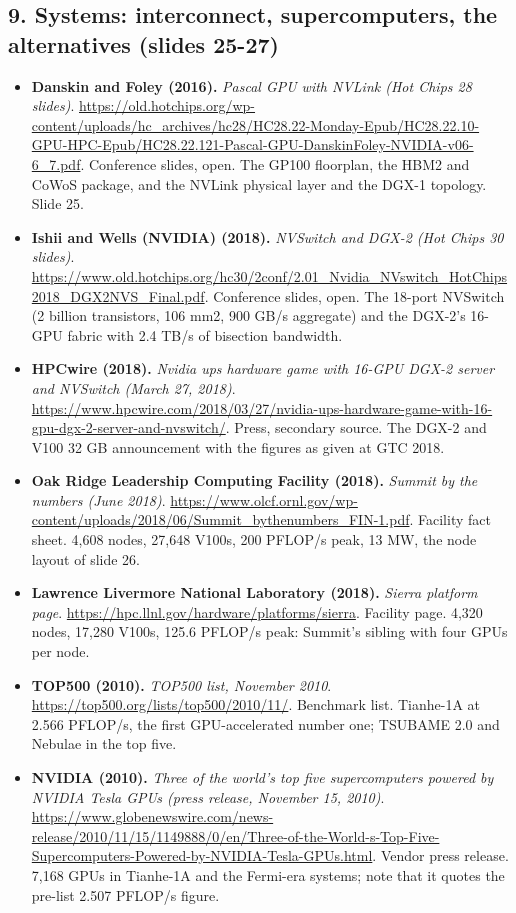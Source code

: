 \subsection*{9. Systems: interconnect, supercomputers, the alternatives (slides 25-27)}
\begin{itemize}[leftmargin=1.2em,itemsep=3pt]\sloppy
\item \textbf{Danskin and Foley (2016).} \textit{Pascal GPU with NVLink (Hot Chips 28 slides)}. \url{https://old.hotchips.org/wp-content/uploads/hc_archives/hc28/HC28.22-Monday-Epub/HC28.22.10-GPU-HPC-Epub/HC28.22.121-Pascal-GPU-DanskinFoley-NVIDIA-v06-6_7.pdf}. Conference slides, open. The GP100 floorplan, the HBM2 and CoWoS package, and the NVLink physical layer and the DGX-1 topology. Slide 25.
\item \textbf{Ishii and Wells (NVIDIA) (2018).} \textit{NVSwitch and DGX-2 (Hot Chips 30 slides)}. \url{https://www.old.hotchips.org/hc30/2conf/2.01_Nvidia_NVswitch_HotChips2018_DGX2NVS_Final.pdf}. Conference slides, open. The 18-port NVSwitch (2 billion transistors, 106 mm2, 900 GB/s aggregate) and the DGX-2's 16-GPU fabric with 2.4 TB/s of bisection bandwidth.
\item \textbf{HPCwire (2018).} \textit{Nvidia ups hardware game with 16-GPU DGX-2 server and NVSwitch (March 27, 2018)}. \url{https://www.hpcwire.com/2018/03/27/nvidia-ups-hardware-game-with-16-gpu-dgx-2-server-and-nvswitch/}. Press, secondary source. The DGX-2 and V100 32 GB announcement with the figures as given at GTC 2018.
\item \textbf{Oak Ridge Leadership Computing Facility (2018).} \textit{Summit by the numbers (June 2018)}. \url{https://www.olcf.ornl.gov/wp-content/uploads/2018/06/Summit_bythenumbers_FIN-1.pdf}. Facility fact sheet. 4,608 nodes, 27,648 V100s, 200 PFLOP/s peak, 13 MW, the node layout of slide 26.
\item \textbf{Lawrence Livermore National Laboratory (2018).} \textit{Sierra platform page}. \url{https://hpc.llnl.gov/hardware/platforms/sierra}. Facility page. 4,320 nodes, 17,280 V100s, 125.6 PFLOP/s peak: Summit's sibling with four GPUs per node.
\item \textbf{TOP500 (2010).} \textit{TOP500 list, November 2010}. \url{https://top500.org/lists/top500/2010/11/}. Benchmark list. Tianhe-1A at 2.566 PFLOP/s, the first GPU-accelerated number one; TSUBAME 2.0 and Nebulae in the top five.
\item \textbf{NVIDIA (2010).} \textit{Three of the world's top five supercomputers powered by NVIDIA Tesla GPUs (press release, November 15, 2010)}. \url{https://www.globenewswire.com/news-release/2010/11/15/1149888/0/en/Three-of-the-World-s-Top-Five-Supercomputers-Powered-by-NVIDIA-Tesla-GPUs.html}. Vendor press release. 7,168 GPUs in Tianhe-1A and the Fermi-era systems; note that it quotes the pre-list 2.507 PFLOP/s figure.

\end{itemize}

